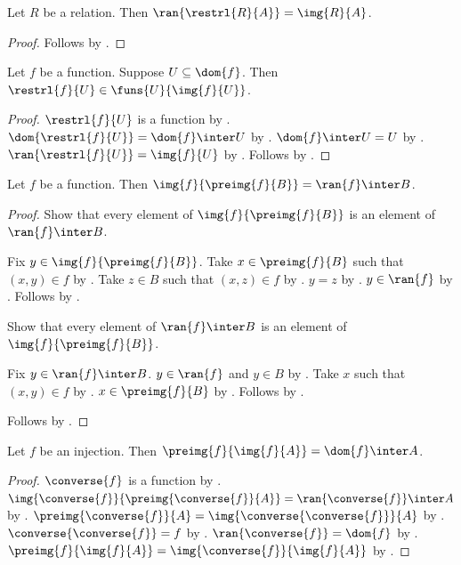\begin{theorem}\label{restriction_range}
    Let $R$ be a relation.
    Then $\ran{\restrl{R}{A}}=\img{R}{A}$.
\end{theorem}
\begin{proof}
    Follows by .
\end{proof}

\begin{theorem}\label{restriction_exact_type_to_image}
    Let $f$ be a function.
    Suppose $U\subseteq\dom{f}$.
    Then $\restrl{f}{U}\in\funs{U}{\img{f}{U}}$.
\end{theorem}
\begin{proof}
    $\restrl{f}{U}$ is a function by .
    $\dom{\restrl{f}{U}}=\dom{f}\inter U$ by .
    $\dom{f}\inter U=U$ by .
    $\ran{\restrl{f}{U}}=\img{f}{U}$ by .
    Follows by .
\end{proof}

\begin{theorem}\label{image_preimage_range_trace}
    Let $f$ be a function.
    Then $\img{f}{\preimg{f}{B}}=\ran{f}\inter B$.
\end{theorem}
\begin{proof}
    Show that every element of $\img{f}{\preimg{f}{B}}$
        is an element of $\ran{f}\inter B$.
    \begin{subproof}
        Fix $y\in\img{f}{\preimg{f}{B}}$.
        Take $x\in\preimg{f}{B}$ such that $(x,y)\in f$ by .
        Take $z\in B$ such that $(x,z)\in f$ by .
        $y=z$ by .
        $y\in\ran{f}$ by .
        Follows by .
    \end{subproof}
    Show that every element of $\ran{f}\inter B$
        is an element of $\img{f}{\preimg{f}{B}}$.
    \begin{subproof}
        Fix $y\in\ran{f}\inter B$.
        $y\in\ran{f}$ and $y\in B$ by .
        Take $x$ such that $(x,y)\in f$ by .
        $x\in\preimg{f}{B}$ by .
        Follows by .
    \end{subproof}
    Follows by .
\end{proof}

\begin{theorem}\label{preimage_image_domain_trace}
    Let $f$ be an injection.
    Then $\preimg{f}{\img{f}{A}}=\dom{f}\inter A$.
\end{theorem}
\begin{proof}
    $\converse{f}$ is a function by .
    $\img{\converse{f}}{\preimg{\converse{f}}{A}}
        =\ran{\converse{f}}\inter A$ by .
    $\preimg{\converse{f}}{A}=\img{\converse{\converse{f}}}{A}$ by
        .
    $\converse{\converse{f}}=f$ by .
    $\ran{\converse{f}}=\dom{f}$ by .
    $\preimg{f}{\img{f}{A}}=\img{\converse{f}}{\img{f}{A}}$ by
        .
\end{proof}

